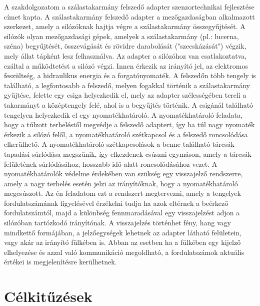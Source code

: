 A szakdolgozatom a szálastakarmány felszedő adapter szenzortechnikai fejlesztése címet kapta. A szálastakarmány felszedő adapter a mezőgazdaságban alkalmazott szerkezet, amely a silózóknak hajtja végre a szálastakarmány összegyűjtését. A silózók olyan mezőgazdasági gépek, amelyek a szálastakarmány (pl.: lucerna, széna) begyűjtését, összevágását és rövidre darabolását ("szecskázását") végzik, mely állat tápként lesz felhasználva. Az adapter a silózóhoz van csatlakoztatva, ezáltal a működtetést a silózó végzi. Innen érkezik az irányító jel, az elektromos feszültség, a hidraulikus energia és a forgatónyomaték. A felszedőn több tengely is található, a legfontosabb a felszedő, melyen fogakkal történik a szálastakarmány gyűjtése, felette egy csiga helyezkedik el, mely az adapter szélességében tereli a takarmányt a középtengely felé, ahol is a begyűjtés történik. A csigánál található tengelyen helyezkedik el egy nyomatékhatároló. A nyomatékhatároló feladata, hogy a túlzott terheléstől megvédje a felszedő adaptert, így ha túl nagy nyomaték érkezik a silózó felől, a nyomatékhatároló szétkapcsol és a felszedő roncsolódása elkerülhető. A nyomatékhatároló szétkapcsolások a benne található tárcsák tapadási súrlódása megszűnik, így elkezdenek csúszni egymáson, amely a tárcsák felületének súrlódásához, hosszabb idő alatt roncsolódásához vezet. A nyomatékhatárolók védelme érdekében van szükség egy visszajelző rendszerre, amely a nagy terhelés esetén jelzi az irányítóknak, hogy a nyomatékhatároló megcsúszott.
Az én feladatom ezt a rendszert megtervezni, amely a tengelyek fordulatszámának figyelésével érzékelni tudja ha azok eltérnek a beérkező fordulatszámtól, majd a különbség fennmaradásával egy visszajelzést adjon a silózóban tartózkodó irányítónak. A visszajelzés történhet fény, hang vagy mindkettő formájában, a jelzőegységek lehetnek az adapter látható felületein, vagy akár az irányító fülkében is. Abban az esetben ha a fülkében egy kijelző elhelyezése és azzal való kommunikáció megoldható, a fordulatszámok aktuális értékei is megjelenítésre kerülhetnek.

\section{Célkitűzések}
\label{celkituzes}

